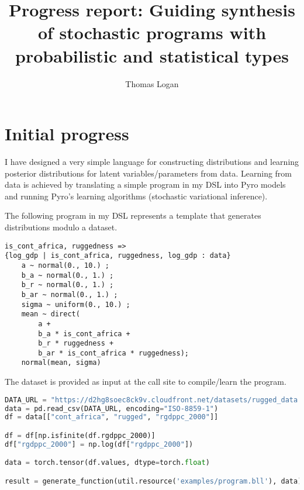 \documentclass[runningheads]{llncs}
\title{Progress report: Guiding synthesis of stochastic programs with probabilistic and statistical types}
\author{Thomas Logan}
\institute{University of Texas at Austin}
\begin{document}
\maketitle

\section{Initial progress}
I have designed a very simple language for constructing distributions and learning posterior distributions for 
latent variables/parameters from data. Learning from data is achieved by translating a simple program in my DSL into Pyro models and running Pyro's learning algorithms (stochastic variational inference).
\newline

\noindent
The following program in my DSL represents a template that generates distributions modulo a dataset.
\begin{lstlisting}
is_cont_africa, ruggedness => 
{log_gdp | is_cont_africa, ruggedness, log_gdp : data}
    a ~ normal(0., 10.) ; 
    b_a ~ normal(0., 1.) ; 
    b_r ~ normal(0., 1.) ; 
    b_ar ~ normal(0., 1.) ;
    sigma ~ uniform(0., 10.) ;
    mean ~ direct(
        a + 
        b_a * is_cont_africa + 
        b_r * ruggedness + 
        b_ar * is_cont_africa * ruggedness);
    normal(mean, sigma)
\end{lstlisting}

\noindent
The dataset is provided as input at the call site to compile/learn the program.
\begin{lstlisting}[language=Python]
DATA_URL = "https://d2hg8soec8ck9v.cloudfront.net/datasets/rugged_data.csv"
data = pd.read_csv(DATA_URL, encoding="ISO-8859-1")
df = data[["cont_africa", "rugged", "rgdppc_2000"]]

df = df[np.isfinite(df.rgdppc_2000)]
df["rgdppc_2000"] = np.log(df["rgdppc_2000"])

data = torch.tensor(df.values, dtype=torch.float)

result = generate_function(util.resource('examples/program.bll'), data)
\end{lstlisting}
\end{document}
